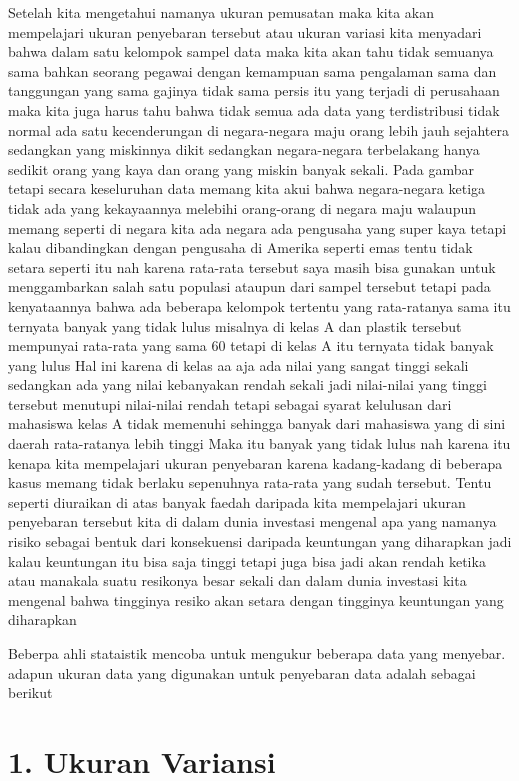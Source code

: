 \documentclass[
]{book}
\theoremstyle{definition}
\theoremstyle{definition}
\theoremstyle{definition}
\theoremstyle{definition}
\theoremstyle{remark}
\begin{document}
Setelah kita mengetahui namanya ukuran pemusatan maka kita akan mempelajari ukuran penyebaran tersebut atau ukuran variasi kita menyadari bahwa dalam satu kelompok sampel data maka kita akan tahu tidak semuanya sama bahkan seorang pegawai dengan kemampuan sama pengalaman sama dan tanggungan yang sama gajinya tidak sama persis itu yang terjadi di perusahaan maka kita juga harus tahu bahwa tidak semua ada data yang terdistribusi tidak normal ada satu kecenderungan di negara-negara maju orang lebih jauh sejahtera sedangkan yang miskinnya dikit sedangkan negara-negara terbelakang hanya sedikit orang yang kaya dan orang yang miskin banyak sekali. Pada gambar tetapi secara keseluruhan data memang kita akui bahwa negara-negara ketiga tidak ada yang kekayaannya melebihi orang-orang di negara maju walaupun memang seperti di negara kita ada negara ada pengusaha yang super kaya tetapi kalau dibandingkan dengan pengusaha di Amerika seperti emas tentu tidak setara seperti itu nah karena rata-rata tersebut saya masih bisa gunakan untuk menggambarkan salah satu populasi ataupun dari sampel tersebut tetapi pada kenyataannya bahwa ada beberapa kelompok tertentu yang rata-ratanya sama itu ternyata banyak yang tidak lulus misalnya di kelas A dan plastik tersebut mempunyai rata-rata yang sama 60 tetapi di kelas A itu ternyata tidak banyak yang lulus Hal ini karena di kelas aa aja ada nilai yang sangat tinggi sekali sedangkan ada yang nilai kebanyakan rendah sekali jadi nilai-nilai yang tinggi tersebut menutupi nilai-nilai rendah tetapi sebagai syarat kelulusan dari mahasiswa kelas A tidak memenuhi sehingga banyak dari mahasiswa yang di sini daerah rata-ratanya lebih tinggi Maka itu banyak yang tidak lulus nah karena itu kenapa kita mempelajari ukuran penyebaran karena kadang-kadang di beberapa kasus memang tidak berlaku sepenuhnya rata-rata yang sudah tersebut.
Tentu seperti diuraikan di atas banyak faedah daripada kita mempelajari ukuran penyebaran tersebut kita di dalam dunia investasi mengenal apa yang namanya risiko sebagai bentuk dari konsekuensi daripada keuntungan yang diharapkan jadi kalau keuntungan itu bisa saja tinggi tetapi juga bisa jadi akan rendah ketika atau manakala suatu resikonya besar sekali dan dalam dunia investasi kita mengenal bahwa tingginya resiko akan setara dengan tingginya keuntungan yang diharapkan

Beberpa ahli stataistik mencoba untuk mengukur beberapa data yang menyebar. adapun ukuran data yang digunakan untuk penyebaran data adalah sebagai berikut

\hypertarget{ukuran-variansi}{%
\section*{1. Ukuran Variansi}\label{ukuran-variansi}}
\end{document}
